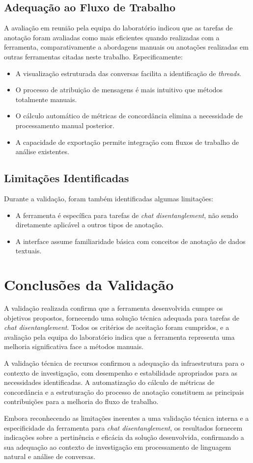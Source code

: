 \subsection{Adequação ao Fluxo de Trabalho}
A avaliação em reunião pela equipa do laboratório indicou que as tarefas de anotação foram avaliadas como mais eficientes quando realizadas com a ferramenta, comparativamente a abordagens manuais ou anotações realizadas em outras ferramentas citadas neste trabalho. Especificamente:
\begin{itemize}
    \item A visualização estruturada das conversas facilita a identificação de \textit{threads}.
    \item O processo de atribuição de mensagens é mais intuitivo que métodos totalmente manuais.
    \item O cálculo automático de métricas de concordância elimina a necessidade de processamento manual posterior.
    \item A capacidade de exportação permite integração com fluxos de trabalho de análise existentes.
\end{itemize}

\subsection{Limitações Identificadas}
Durante a validação, foram também identificadas algumas limitações:
\begin{itemize}
    \item A ferramenta é específica para tarefas de \textit{chat disentanglement}, não sendo diretamente aplicável a outros tipos de anotação.
    \item A interface assume familiaridade básica com conceitos de anotação de dados textuais.
\end{itemize}

\section{Conclusões da Validação}

A validação realizada confirma que a ferramenta desenvolvida cumpre os objetivos propostos, fornecendo uma solução técnica adequada para tarefas de \textit{chat disentanglement}. Todos os critérios de aceitação foram cumpridos, e a avaliação pela equipa do laboratório indica que a ferramenta representa uma melhoria significativa face a métodos manuais.

A validação técnica de recursos confirmou a adequação da infraestrutura para o contexto de investigação, com desempenho e estabilidade apropriados para as necessidades identificadas. A automatização do cálculo de métricas de concordância e a estruturação do processo de anotação constituem as principais contribuições para a melhoria do fluxo de trabalho.

Embora reconhecendo as limitações inerentes a uma validação técnica interna e a especificidade da ferramenta para \textit{chat disentanglement}, os resultados fornecem indicações sobre a pertinência e eficácia da solução desenvolvida, confirmando a sua adequação ao contexto de investigação em processamento de linguagem natural e análise de conversas.
